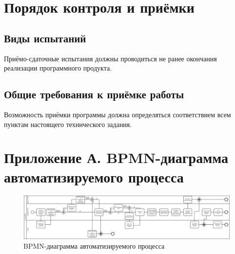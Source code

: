 \documentclass[14pt, a4paper]{extarticle}
\begin{document}
	\section{Порядок контроля и приёмки}
	\subsection{Виды испытаний}
	Приёмо-сдаточные испытания должны проводиться не ранее окончания реализации программного продукта.
	\subsection{Общие требования к приёмке работы}
	Возможность приёмки программы должна определяться соответствием всем пунктам настоящего технического задания.
	
	\newpage
	\section*{Приложение А. BPMN-диаграмма автоматизируемого процесса}
	\begin{figure}[h!]
		\includegraphics[width=\linewidth]{diagram.png}
		\caption{BPMN-диаграмма автоматизируемого процесса}
		\label{fig:diagram1}
	\end{figure}

	\newpage
\end{document}
